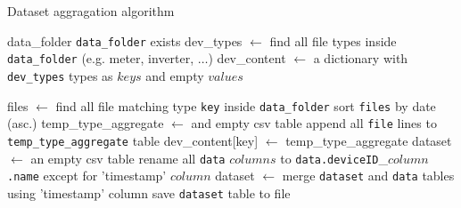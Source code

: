 \begin{algorithm}[H]
	\caption{Dataset aggragation algorithm}\label{alg:dataset}
	\begin{algorithmic}
		\Require data\_folder
		\Ensure \texttt{data\_folder} exists
		\State dev\_types $\gets$ find all file types inside \texttt{data\_folder} (e.g. meter, inverter, $\ldots$)
		\State dev\_content $\gets$ a dictionary with \texttt{dev\_types} types as $keys$ and empty $values$

		\State files $\gets$ find all file matching type \texttt{key} inside \texttt{data\_folder}
		\State sort \texttt{files} by date (asc.)
		\State temp\_type\_aggregate $\gets$ and empty csv table
		\State append all \texttt{file} lines to \texttt{temp\_type\_aggregate} table
		\EndFor
		\State dev\_content[key] $\gets$ temp\_type\_aggregate
		\EndFor
		\State{}
		\State
		\State dataset $\gets$ an empty csv table
		 
		\State rename all \texttt{data} $columns$ to \texttt{data.deviceID}\_\texttt{$column$.name}
		\State except for 'timestamp' $column$
		\State dataset $\gets$ merge \texttt{dataset} and \texttt{data} tables using 'timestamp' column
		\EndFor
		\State save \texttt{dataset} table to file
	\end{algorithmic}
\end{algorithm}

